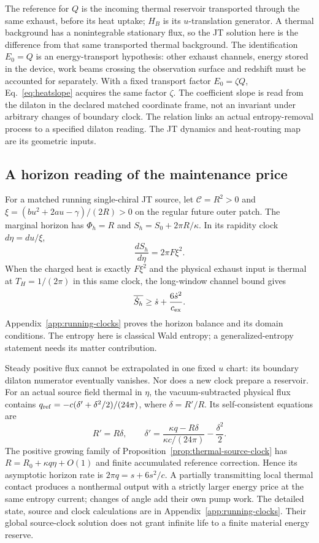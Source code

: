 \documentclass[12pt,a4paper]{article}
\begin{document}
The reference for $Q$ is the incoming thermal reservoir transported through the
same exhaust, before its heat uptake; $H_B$ is its $u$-translation generator.
A thermal background has a nonintegrable stationary flux, so the JT solution here
is the difference from that same transported thermal background.
The identification $E_0=Q$ is an energy-transport hypothesis:
other exhaust channels, energy stored in the device, work beams crossing the
observation surface and redshift must be accounted for separately. With a fixed
transport factor $E_0=\zeta Q$, Eq.~\eqref{eq:heatslope} acquires the same factor
$\zeta$. The coefficient slope is read from the dilaton in the declared matched
coordinate frame, not an invariant under arbitrary changes of boundary clock.
The relation links an actual entropy-removal process to a specified dilaton reading.
The JT dynamics and heat-routing map are its geometric inputs.


\subsection{A horizon reading of the maintenance price}

For a matched running single-chiral JT source, let
$\mathcal C=R^2>0$ and
$\xi=(bu^2+2au-\gamma)/(2R)>0$ on the regular future outer patch.
The marginal horizon has $\Phi_h=R$ and
$S_h=S_0+2\pi R/\kappa$. In its rapidity clock $d\eta=du/\xi$,
\[
 \frac{dS_h}{d\eta}=2\pi F\xi^2.
\]
When the charged heat is exactly $F\xi^2$ and the physical exhaust
input is thermal at $T_H=1/(2\pi)$ in this same clock, the
long-window channel bound gives
\[
 \overline{\dot S_h}\ge\dot s+\frac{6\dot s^2}{c_{\rm ex}}.
\]
Appendix~\ref{app:running-clocks} proves the horizon balance and its
domain conditions. The entropy here is classical Wald entropy; a
generalized-entropy statement needs its matter contribution.

Steady positive flux cannot be extrapolated in one fixed $u$ chart:
its boundary dilaton numerator eventually vanishes. Nor does a new
clock prepare a reservoir. For an actual source field thermal in
$\eta$, the vacuum-subtracted physical flux contains
$q_{\rm ref}=-c(\delta'+\delta^2/2)/(24\pi)$, where
$\delta=R'/R$. Its self-consistent equations are
\[
 R'=R\delta,\qquad
 \delta'=\frac{\kappa q-R\delta}{\kappa c/(24\pi)}
                         -\frac{\delta^2}{2}.
\]
The positive growing family of
Proposition~\ref{prop:thermal-source-clock} has
$R=R_0+\kappa q\eta+O(1)$ and finite accumulated reference
correction. Hence its asymptotic horizon rate is
$2\pi q=s+6s^2/c$. A partially transmitting local thermal contact
produces a nonthermal output with a strictly larger energy price at
the same entropy current; changes of angle add their own pump work.
The detailed state, source and clock calculations are in
Appendix~\ref{app:running-clocks}. Their global source-clock solution
does not grant infinite life to a finite material energy reserve.
\end{document}

